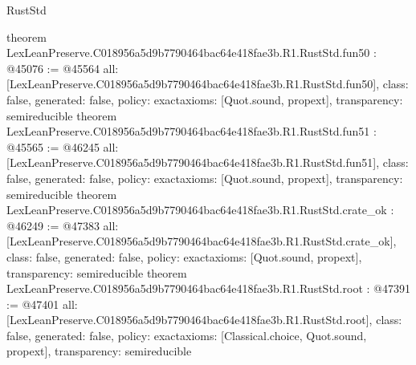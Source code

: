 \begin{lexlean}{RustStd}
\begin{coremodule}
{}
theorem LexLeanPreserve.C018956a5d9b7790464bac64e418fae3b.R1.RustStd.fun50 : @45076 := @45564 {
  all: [LexLeanPreserve.C018956a5d9b7790464bac64e418fae3b.R1.RustStd.fun50],
  class: false,
  generated: false,
  policy: exact{axioms: [Quot.sound, propext]},
  transparency: semireducible
}
theorem LexLeanPreserve.C018956a5d9b7790464bac64e418fae3b.R1.RustStd.fun51 : @45565 := @46245 {
  all: [LexLeanPreserve.C018956a5d9b7790464bac64e418fae3b.R1.RustStd.fun51],
  class: false,
  generated: false,
  policy: exact{axioms: [Quot.sound, propext]},
  transparency: semireducible
}
theorem LexLeanPreserve.C018956a5d9b7790464bac64e418fae3b.R1.RustStd.crate_ok : @46249 := @47383 {
  all: [LexLeanPreserve.C018956a5d9b7790464bac64e418fae3b.R1.RustStd.crate_ok],
  class: false,
  generated: false,
  policy: exact{axioms: [Quot.sound, propext]},
  transparency: semireducible
}
theorem LexLeanPreserve.C018956a5d9b7790464bac64e418fae3b.R1.RustStd.root : @47391 := @47401 {
  all: [LexLeanPreserve.C018956a5d9b7790464bac64e418fae3b.R1.RustStd.root],
  class: false,
  generated: false,
  policy: exact{axioms: [Classical.choice, Quot.sound, propext]},
  transparency: semireducible
}


\end{coremodule}
\end{lexlean}
